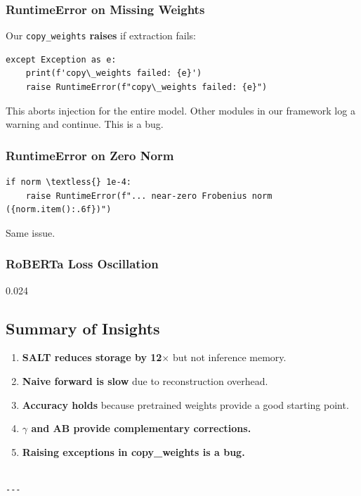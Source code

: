 \subsubsection{RuntimeError on Missing Weights}

Our \texttt{copy\_weights} \textbf{raises} if extraction fails:

\begin{lstlisting}
except Exception as e:
    print(f'copy\_weights failed: {e}')
    raise RuntimeError(f"copy\_weights failed: {e}")
\end{lstlisting}

This aborts injection for the entire model. Other modules in our framework 
log a warning and continue. This is a bug.

\subsubsection{RuntimeError on Zero Norm}

\begin{lstlisting}
if norm \textless{} 1e-4:
    raise RuntimeError(f"... near-zero Frobenius norm ({norm.item():.6f})")
\end{lstlisting}

Same issue.

\subsubsection{RoBERTa Loss Oscillation}

0.024

\subsection{Summary of Insights}

\begin{enumerate}
\item \textbf{SALT reduces storage by 12$\times$} but not inference memory.
\item \textbf{Naive forward is slow} due to reconstruction overhead.
\item \textbf{Accuracy holds} because pretrained weights provide a good starting point.
\item \textbf{$\gamma$ and AB provide complementary corrections.}
\item \textbf{Raising exceptions in copy\_weights is a bug.}
\end{enumerate}
\begin{lstlisting}

---
\end{lstlisting}

